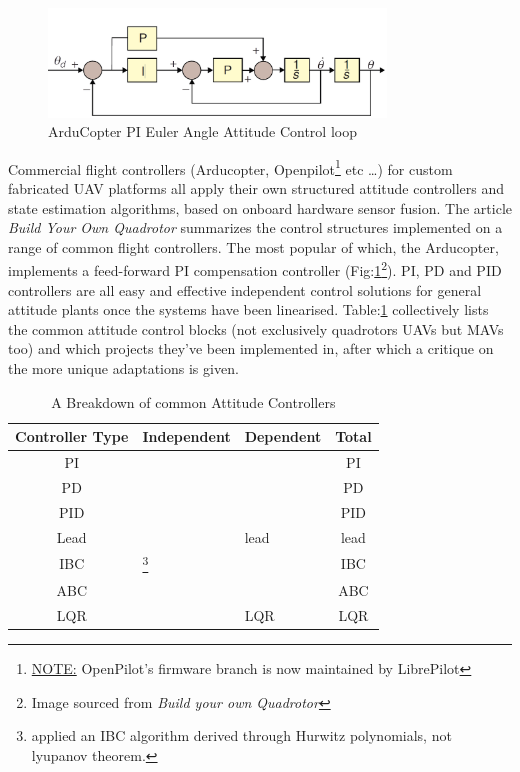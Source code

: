 \par
\begin{figure}[hbtp]
\centering
\includegraphics[width=0.8\textwidth]{figs/arducopter-pi}
\caption{ArduCopter PI Euler Angle Attitude Control loop}
\label{fig:arducopter-pi}
\end{figure}
Commercial flight controllers (Arducopter\cite{arducoptersite}, Openpilot\cite{openpilotsite}\footnote{\underline{NOTE:} OpenPilot's firmware branch is now maintained by LibrePilot} etc \ldots) for custom fabricated UAV platforms all apply their own structured attitude controllers and state estimation algorithms, based on onboard hardware sensor fusion. The article \emph{Build Your Own Quadrotor}\cite{buildyourownquad} summarizes the control structures implemented on a range of common flight controllers. The most popular of which, the Arducopter, implements a feed-forward PI compensation controller (Fig:\ref{fig:arducopter-pi}\footnote{Image sourced from \emph{Build your own Quadrotor}\cite{buildyourownquad}}).  PI, PD and PID controllers are all easy and effective independent control solutions for general attitude plants once the systems have been linearised. Table:\ref{tab:controllers} collectively lists the common attitude control blocks (not exclusively quadrotors UAVs but MAVs too) and which projects they've been implemented in, after which a critique on the more unique adaptations is given.
\begin{table}[h]
\centering
\begin{tabular}{ |c|l|l|c| }
\hline
Controller Type & Independent & Dependent & Total\\ \hline
PI & \cite{attitudecontrolproblem} & \cite{attitudecontrolproblem} & PI\\ \hline
PD & \cite{modelingquadcopter, tiltrihani} & \cite{fullquaternion,singleaxistilting} & PD\\ \hline
PID & \cite{optimizedpidquadcopter, attitudecontrolproblem, quaddynamics, tiltpropellercontrol, pidlqr} & \cite{attitudecontrolproblem, starmac, adaptivedisturbancecontrol} & PID\\ \hline
Lead & \cite{x4flyer, dynamicmodelling2009} & lead & lead\\ \hline
IBC & \cite{tpheonix, backsteppingquadcoptercontrol}\footnote{\cite{tpheonix} applied an IBC algorithm derived through Hurwitz polynomials, not lyupanov theorem.} & \cite{backsteppingquadcoptercontrol} & IBC\\ \hline
ABC & \multicolumn{2}{l|}{\cite{adaptivebackstep, nonlinearadaptive, 6dofbackstep, intelligentbackstep}} & ABC\\ \hline
LQR & \cite{pidlqr} & LQR & LQR\\ \hline
\end{tabular}
\caption{A Breakdown of common Attitude Controllers}
\label{tab:controllers}
\end{table}
